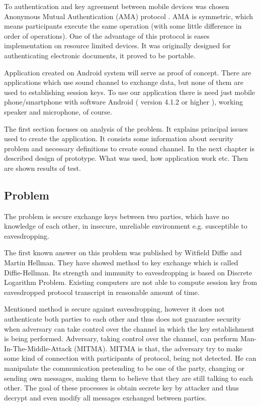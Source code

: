 \documentclass[11pt,titlepage]{article}
\theoremstyle{plain}
\begin{document}
\vspace{5mm}

To authentication and key agreement between mobile devices was chosen Anonymous Mutual Authentication (AMA) protocol \cite{AMA}. AMA is symmetric, which means  participants execute the same operation (with some little difference in order of operations). One of
the advantage of this protocol is eases implementation on resource limited devices. It was originally designed for authenticating electronic documents, it proved to be portable.

\vspace{5mm}

Application created on Android system will serve as proof of concept. There are applications which use sound channel to exchange data, but none of them are used to establishing session keys. To use our application there is need just mobile phone/smartphone with software Android ( version 4.1.2 or higher ), working speaker and microphone, of course.

\vspace{5mm}

The first section focuses on analysis of the problem. It explains principal issues used to create the application. It consists some information about security problem and necessary definitions to create sound channel. In the next chapter is described design of prototype. What was used, how application work etc. Then are shown results of test.


\subsection{Problem}
The problem is secure exchange keys between two parties, which have no knowledge of each other, in insecure, unreliable environment e.g. susceptible to eavesdropping.

\vspace{5mm}

The first known answer on this problem was published by Witfield Diffie and Martin Hellman. They have showed method to key exchange which is called Diffie-Hellman. Its strength and immunity to eavesdropping is based on Discrete Logarithm Problem. Existing computers are not able to compute session key from eavesdropped protocol transcript in reasonable amount of time.

\vspace{5mm}

Mentioned method is secure against eavesdropping, however it does not authenticate both parties to each other and thus does not guarantee security when adversary can take control over the channel in which the key establishment is being performed. Adversary, taking control over the channel, can perform Man-In-The-Middle-Attack (MITMA). MITMA is that, the adversary try to make some kind of connection with participants of protocol, being not detected. He can manipulate the communication pretending to be one of the party, changing or sending own messages, making them to believe that they are still talking to each other. The goal of these processes is obtain secrete key by attacker and thus decrypt and even modify all messages exchanged between parties.
\end{document}
